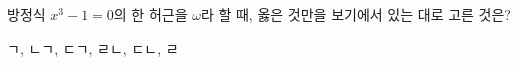 방정식 $x^3-1=0$의 한 허근을 $\omega$라 할 때, 옳은 것만을 보기에서 있는 대로 고른 것은?  
\begin{choices32}{ㄱ, ㄴ}{ㄱ, ㄷ}{ㄱ, ㄹ}{ㄴ, ㄷ}{ㄴ, ㄹ}\end{choices32}
